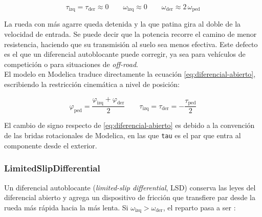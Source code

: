 \begin{equation}
	\tau_\text{izq} = \tau_\text{der} \approx 0
	\qquad
	\omega_\text{izq} \approx 0
	\qquad
	\omega_\text{der} \approx 2\,\omega_\text{ped}
	\label{eq:mu-split}
\end{equation}

La rueda con más agarre queda detenida y la que patina gira al doble de la velocidad de entrada. Se puede decir que la potencia recorre el camino de menor resistencia, haciendo que su transmisión al suelo sea menos efectiva. Este defecto es el que un diferencial autoblocante puede corregir, ya sea para vehículos de competición o para situaciones de \textit{off-road}.\\

El modelo en Modelica traduce directamente la ecuación \eqref{eq:diferencial-abierto}, escribiendo la restricción cinemática a nivel de posición:

\begin{equation}
	\varphi_\text{ped} = \frac{\varphi_\text{izq} + \varphi_\text{der}}{2}
	\qquad
	\tau_\text{izq} = \tau_\text{der} = -\frac{\tau_\text{ped}}{2}
\end{equation}

El cambio de signo respecto de \eqref{eq:diferencial-abierto} es debido a la convención de las bridas rotacionales de Modelica, en las que \verb|tau| es el par que entra al componente desde el exterior.


\subsubsection{LimitedSlipDifferential}

Un diferencial autoblocante (\textit{limited-slip differential}, LSD) conserva las leyes del diferencial abierto y agrega un dispositivo de fricción que transfiere par desde la rueda más rápida hacia la más lenta. Si $\omega_\text{izq} > \omega_\text{der}$, el reparto pasa a ser \cite{gadola2021}:

